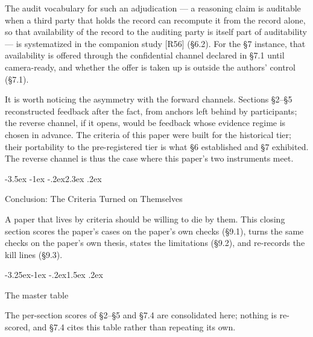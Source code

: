 \documentclass[11pt,a4paper]{article}
\makeatletter
\renewcommand\section{\@startsection{section}{1}{\z@}%
  {-3.5ex \@plus -1ex \@minus -.2ex}{2.3ex \@plus .2ex}%
  {\normalfont\Large\bfseries\raggedright}}
\renewcommand\subsection{\@startsection{subsection}{2}{\z@}%
  {-3.25ex\@plus -1ex \@minus -.2ex}{1.5ex \@plus .2ex}%
  {\normalfont\large\bfseries\raggedright}}
\makeatother
\begin{document}
The audit vocabulary for such an adjudication — a reasoning claim is auditable when a third party that holds the record can recompute it from the record alone, so that availability of the record to the auditing party is itself part of auditability — is systematized in the companion study [R56] (§6.2). For the §7 instance, that availability is offered through the confidential channel declared in §7.1 until camera-ready, and whether the offer is taken up is outside the authors' control (§7.1).

It is worth noticing the asymmetry with the forward channels. Sections §2–§5 reconstructed feedback after the fact, from anchors left behind by participants; the reverse channel, if it opens, would be feedback whose evidence regime is chosen in advance. The criteria of this paper were built for the historical tier; their portability to the pre-registered tier is what §6 established and §7 exhibited. The reverse channel is thus the case where this paper's two instruments meet.

\section{Conclusion: The Criteria Turned on Themselves}

A paper that lives by criteria should be willing to die by them. This closing section scores the paper's cases on the paper's own checks (§9.1), turns the same checks on the paper's own thesis, states the limitations (§9.2), and re-records the kill lines (§9.3).

\subsection{The master table}

The per-section scores of §2–§5 and §7.4 are consolidated here; nothing is re-scored, and §7.4 cites this table rather than repeating its own.
\end{document}

